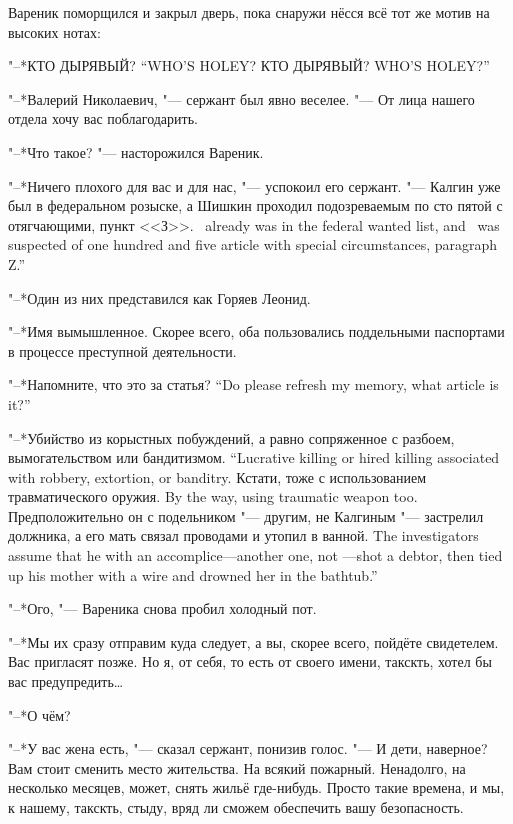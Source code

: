 \textspace

Вареник поморщился и закрыл дверь, пока снаружи нёсся всё тот же мотив на высоких нотах:

{"--*КТО ДЫРЯВЫЙ?}
{``WHO'S HOLEY?}
{КТО ДЫРЯВЫЙ?}
{WHO'S HOLEY?''}

\asterism

\textspace

"--*Валерий Николаевич, "--- сержант был явно веселее.
"--- От лица нашего отдела хочу вас поблагодарить.

"--*Что такое? "--- насторожился Вареник.

"--*Ничего плохого для вас и для нас, "--- успокоил его сержант.
{"--- Калгин уже был в федеральном розыске, а Шишкин проходил подозреваемым по сто пятой с отягчающими, пункт <<З>>.}
{\Kalgin\ already was in the federal wanted list, and \Shishkin\ was suspected of one hundred and five article with special circumstances, paragraph Z.''}

"--*Один из них представился как Горяев Леонид.

"--*Имя вымышленное.
Скорее всего, оба пользовались поддельными паспортами в процессе преступной деятельности.

{"--*Напомните, что это за статья?}
{``Do please refresh my memory, what article is it?''}

{"--*Убийство из корыстных побуждений, а равно сопряженное с разбоем, вымогательством или бандитизмом.}
{``Lucrative killing or hired killing associated with robbery, extortion, or banditry.}
{Кстати, тоже с использованием травматического оружия.}
{By the way, using traumatic weapon too.}
{Предположительно он с подельником "--- другим, не Калгиным "--- застрелил должника, а его мать связал проводами и утопил в ванной.}
{The investigators assume that he with an accomplice---another one, not \Kalgin---shot a debtor, then tied up his mother with a wire and drowned her in the bathtub.''}

"--*Ого, "--- Вареника снова пробил холодный пот.

"--*Мы их сразу отправим куда следует, а вы, скорее всего, пойдёте свидетелем.
Вас пригласят позже.
Но я, от себя, то есть от своего имени, такскть, хотел бы вас предупредить\ldots{}

"--*О чём?

"--*У вас жена есть, "--- сказал сержант, понизив голос.
"--- И дети, наверное?
Вам стоит сменить место жительства.
На всякий пожарный.
Ненадолго, на несколько месяцев, может, снять жильё где-нибудь.
Просто такие времена, и мы, к нашему, такскть, стыду, вряд ли сможем обеспечить вашу безопасность.

